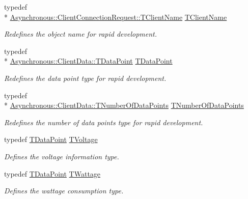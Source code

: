 \begin{DoxyCompactItemize}
typedef \\*
\hyperlink{class_terra_swarm_1_1_asynchronous_1_1_client_connection_request_a50a16fcfef8eb10d5191b6eaf0723a92}{Asynchronous\-::\-Client\-Connection\-Request\-::\-T\-Client\-Name} \hyperlink{class_system_manager_a2d2818eaeb5787ef4f4d009ff343d195}{T\-Client\-Name}
\begin{DoxyCompactList}\small\item\em Redefines the object name for rapid development. \end{DoxyCompactList}\item 
typedef \\*
\hyperlink{class_terra_swarm_1_1_asynchronous_1_1_client_data_ac733720fed15e940f991de44f1bb514e}{Asynchronous\-::\-Client\-Data\-::\-T\-Data\-Point} \hyperlink{class_system_manager_a177b09f79bd2cef44160fb4d8ea77996}{T\-Data\-Point}
\begin{DoxyCompactList}\small\item\em Redefines the data point type for rapid development. \end{DoxyCompactList}\item 
typedef \\*
\hyperlink{class_terra_swarm_1_1_asynchronous_1_1_client_data_a690994afd0ba9b8eeb56ae679a5c64e8}{Asynchronous\-::\-Client\-Data\-::\-T\-Number\-Of\-Data\-Points} \hyperlink{class_system_manager_a9cb6753ad6cd26b6ad46c194f38bee77}{T\-Number\-Of\-Data\-Points}
\begin{DoxyCompactList}\small\item\em Redefines the number of data points type for rapid development. \end{DoxyCompactList}\item 
typedef \hyperlink{class_system_manager_a177b09f79bd2cef44160fb4d8ea77996}{T\-Data\-Point} \hyperlink{class_system_manager_a4194454c8c982c9e4d450e16625dd19c}{T\-Voltage}
\begin{DoxyCompactList}\small\item\em Defines the voltage information type. \end{DoxyCompactList}\item 
typedef \hyperlink{class_system_manager_a177b09f79bd2cef44160fb4d8ea77996}{T\-Data\-Point} \hyperlink{class_system_manager_a924f6502f78c31bbf5f462f9554d4fc5}{T\-Wattage}
\begin{DoxyCompactList}\small\item\em Defines the wattage consumption type. \end{DoxyCompactList}\end{DoxyCompactItemize}
